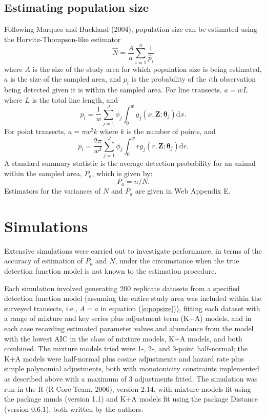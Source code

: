 \documentclass[useAMS,referee]{biom}
\begin{document}
\subsection{Estimating population size}
\label{s:popsize}

Following Marques and Buckland (2004), population size can be estimated using the Horvitz-Thompson-like estimator
\begin{equation}
\label{e:popsize}
\hat{N}=\frac{A}{a}\sum_{i=1}^n \frac{1}{\hat {p}_i}
\end{equation}
where $A$ is the size of the study area for which population size is being estimated, $a$ is the size of the sampled area, and $p_i$ is the probability of the $i\text{th}$ observation being detected given it is within the sampled area.  For line transects, $a=wL$ where $L$ is the total line length, and 
\begin{equation*}
p_i = \frac{1}{w} \sum_{j=1}^J \phi_j \int_0^w  g_j(x,\mathbf{Z}; \bm{\theta}_j) \text{d}x.
\end{equation*}
For point transects, $a=\pi w^2 k$ where $k$ is the number of points, and 
\begin{equation*}
p_i = \frac{2\pi}{w^2} \sum_{j=1}^J \phi_j \int_0^w  r g_j(r,\mathbf{Z}; \bm{\theta}_j) \text{d}r.
\end{equation*}
A standard summary statistic is the average detection probability for an animal within the sampled area, $P_a$, which is given by:
\begin{equation*}
P_a = n/N.
\end{equation*}
Estimators for the variances of $N$ and $P_a$ are given in Web Appendix E.


\section{Simulations}
\label{s:sims}

Extensive simulations were carried out to investigate performance, in terms of the accuracy of estimation of $P_a$ and $N$, under the circumstance when the true detection function model is not known to the estimation procedure.  

Each simulation involved generating 200 replicate datasets from a specified detection function model (assuming the entire study area was included within the surveyed transects, i.e., $A=a$ in equation (\ref{e:popsize})), fitting each dataset with a range of mixture and key series plus adjustment term (K+A) models, and in each case recording estimated parameter values and abundance from the model with the lowest AIC in the class of mixture models, K+A models, and both combined.  The mixture models tried were 1-, 2-, and 3-point half-normal; the K+A models were half-normal plus cosine adjustments and hazard rate plus simple polynomial adjustments, both with monotonicity constraints implemented as described above with a maximum of 3 adjustments fitted. The simulation was run in the R (R Core Team, 2006), version 2.14, with mixture models fit using the package mmds (version 1.1) and K+A models fit using the package Distance (version 0.6.1), both written by the authors.
\end{document}
